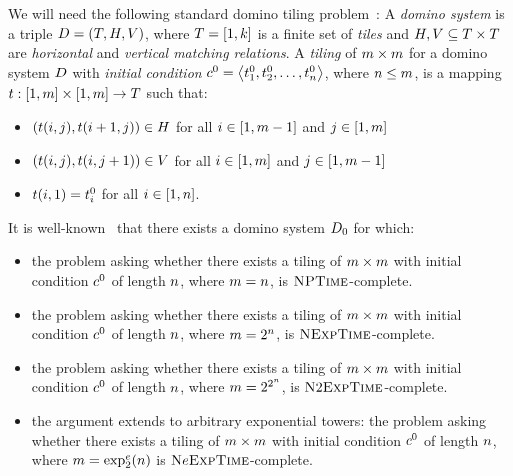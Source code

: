 
We will need the following standard domino tiling
problem~\cite[p. 403]{cervesato2008logic}:
A \emph{domino system} is a triple $D = (T, H, V)$, where
$T = [1,k]$ is a finite set of \emph{tiles} and
$H, V \subseteq {T\times T}$ are \emph{horizontal} and \emph{vertical
matching relations}.
A \emph{tiling} of $m\times m$ for a domino system $D$ with
\emph{initial condition} $c^0 = \left\langle t_{1}^0,t_{2}^0,\dots,t_{n}^0 \right\rangle$,
where $n \leq m$,
is a mapping $t : {[1,m]\times [1,m]} \to T$ such that:
\begin{itemize}
  \item $(t(i,j),t(i+1,j)) \in H$
  for all $i \in [1,m-1]$ and $j \in [1,m]$
  \item $(t(i,j),t(i,j+1)) \in V$
  for all $i \in [1,m]$ and $j \in [1,m-1]$
  \item $t(i, 1) = t_{i}^0$ for all $i \in [1,n]$.
\end{itemize}
It is well-known~\cite{boerger1997classical,van1997convenience} 
that there exists a domino system $D_0$ for which:
\begin{itemize}
  \item the problem asking whether there exists a tiling of $m \times m$
  with initial condition $c^0$ of length $n$, where $m = n$,
  is $\text{\normalfont{\scshape NPTime}}$-complete.
  \item the problem asking whether there exists a tiling of $m \times m$
  with initial condition $c^0$ of length $n$, where $m = 2^n$,
  is $\text{\normalfont{\scshape NExpTime}}$-complete.
  \item the problem asking whether there exists a tiling of $m \times m$
  with initial condition $c^0$ of length $n$, where $m = 2^{2^n}$,
  is $\text{\normalfont{\scshape N}}2\text{\normalfont{\scshape ExpTime}}$-complete.
  \item the argument extends to arbitrary exponential towers:
  the problem asking whether there exists a tiling of $m \times m$
  with initial condition $c^0$ of length $n$, where $m = \exp_{2}^{e}(n)$
  is $\text{\normalfont{\scshape N}}e\text{\normalfont{\scshape ExpTime}}$-complete.
\end{itemize}